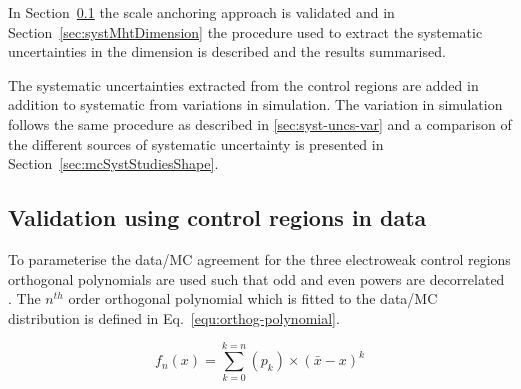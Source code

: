 In Section~\ref{sec:valid13} the scale anchoring approach is validated and 
in Section~\ref{sec:systMhtDimension} the procedure used to 
extract the systematic uncertainties in the \mht dimension is described 
and the results summarised.

The systematic uncertainties extracted from the control regions
are added in addition to systematic from variations in simulation.
The variation in simulation follows the same procedure as described in
\ref{sec:syst-uncs-var} and a comparison of the different sources of systematic uncertainty
is presented in Section~\ref{sec:mcSystStudiesShape}.

\subsection{Validation using control regions in data}
\label{sec:valid13}
To parameterise the data/MC agreement
for the three electroweak control regions
orthogonal polynomials are used such that odd and even powers 
are decorrelated \cite{cohen2013applied}. 
The $n^{th}$ order orthogonal polynomial which is fitted to the data/MC 
distribution is defined in Eq.~\ref{equ:orthog-polynomial}.

\begin{equation}
  \label{equ:orthog-polynomial}
  f_n(x) = \sum_{k=0}^{k=n}{(p_k)\times(\bar{x}-x)^k}
\end{equation}

